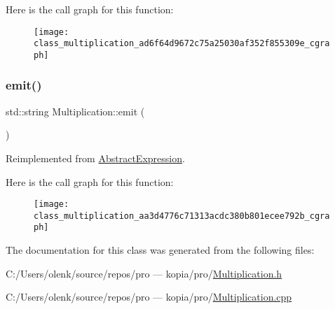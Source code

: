 Here is the call graph for this function\+:
\nopagebreak
\begin{figure}[H]
\begin{center}
\leavevmode
\texttt{[image: class\_multiplication\_ad6f64d9672c75a25030af352f855309e\_cgraph]}
\end{center}
\end{figure}
\mbox{\label{class_multiplication_aa3d4776c71313acdc380b801ecee792b}} 
\subsubsection{\texorpdfstring{emit()}{emit()}}
{\footnotesize\ttfamily std\+::string Multiplication\+::emit (\begin{DoxyParamCaption}{ }\end{DoxyParamCaption})\hspace{0.3cm}{\ttfamily [virtual]}}



Reimplemented from \mbox{\hyperlink{class_abstract_expression_a9f19c05e663491688cdf4423e002a391}{Abstract\+Expression}}.

Here is the call graph for this function\+:
\nopagebreak
\begin{figure}[H]
\begin{center}
\leavevmode
\texttt{[image: class\_multiplication\_aa3d4776c71313acdc380b801ecee792b\_cgraph]}
\end{center}
\end{figure}


The documentation for this class was generated from the following files\+:\begin{DoxyCompactItemize}
\item 
C\+:/\+Users/olenk/source/repos/pro — kopia/pro/\mbox{\hyperlink{_multiplication_8h}{Multiplication.\+h}}\item 
C\+:/\+Users/olenk/source/repos/pro — kopia/pro/\mbox{\hyperlink{_multiplication_8cpp}{Multiplication.\+cpp}}\end{DoxyCompactItemize}
